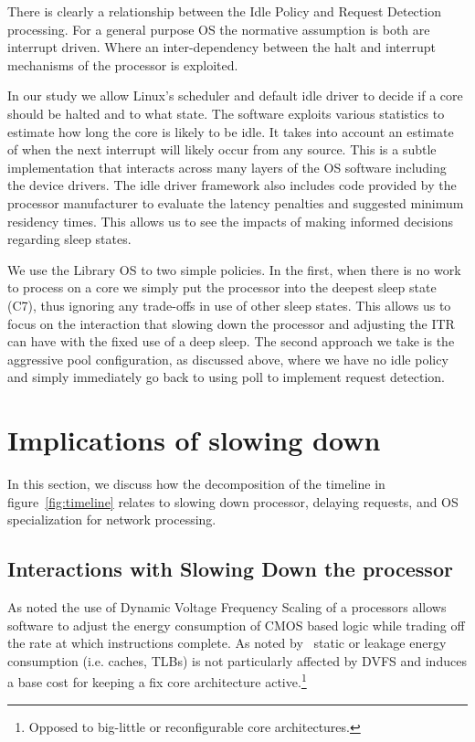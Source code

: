 
There is clearly a relationship between the Idle Policy and Request Detection processing.  For a general purpose OS the normative assumption is both are interrupt driven.  Where an inter-dependency between the halt and interrupt mechanisms of the processor is exploited.  

In our study we allow Linux's scheduler and default idle driver to decide if a core should be halted and to what state.  The software exploits various statistics to estimate how long the core is likely to be idle. It takes into account an estimate of when the next interrupt will likely occur from any source.  This is a subtle implementation that interacts across many layers of the OS software including the device drivers.  The idle driver framework also includes code provided by the processor manufacturer to evaluate the latency penalties and suggested minimum residency times.  This allows us to see the impacts of making informed decisions regarding sleep states.  

We use the Library OS to two simple policies.  In the first, when there is no work to process on a core we simply put the processor into the deepest sleep state (C7), thus ignoring any trade-offs in use of other sleep states.   This allows us to focus on the interaction that slowing down the processor and adjusting the ITR can have with the fixed use of a deep sleep.   The second approach we take is the aggressive pool configuration, as discussed above, where we have no idle policy and simply immediately go back to using poll to implement request detection.

\section{Implications of slowing down}
\label{sec:slowdown}
In this section, we discuss how the decomposition of the timeline in figure~\ref{fig:timeline} relates to slowing down processor, delaying requests, and OS specialization for network processing.

\subsection{Interactions with Slowing Down the processor}
\label{sec:workflow:dvfs}

As noted the use of Dynamic Voltage Frequency Scaling of a processors allows software to adjust the energy consumption of CMOS based logic while trading off the rate at which instructions complete.  As noted by~\cite{slowdownorsleep, 10.1109/40.888701, pacingtoidle, udpm} static or leakage energy consumption (i.e. caches, TLBs) is not particularly affected by DVFS and induces a base cost for keeping a fix core architecture active.\footnote{Opposed to big-little or reconfigurable core architectures.}

